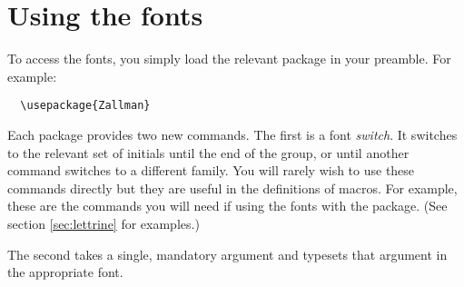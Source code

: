 \documentclass[11pt,british,a4paper]{article}
\begin{document}
\section{Using the fonts}\label{sec:usage}

To access the fonts, you simply load the relevant package in your preamble.
For example:
\begin{verbatim}
  \usepackage{Zallman}
\end{verbatim}

Each package provides two new commands.
The first is a font \emph{switch}.
It switches to the relevant set of initials until the end of the group, or until another command switches to a different family.
You will rarely wish to use these commands directly but they are useful in the definitions of macros.
For example, these are the commands you will need if using the fonts with the  package.
(See section \ref{sec:lettrine} for examples.)

The second takes a single, mandatory argument and typesets that argument in the appropriate font.
\end{document}
